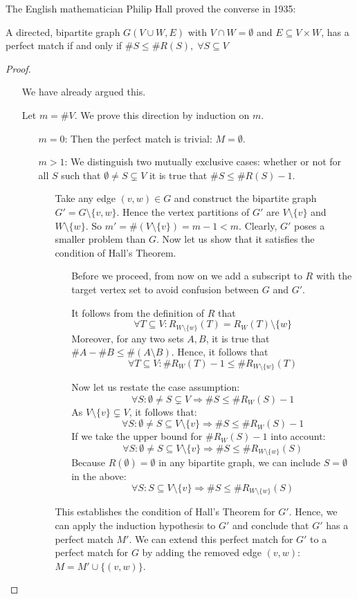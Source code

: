 The English mathematician Philip Hall proved the converse in 1935:
\begin{theorem} \label{hall}
A directed, bipartite graph $G(V \cup W,E)$ with $V \cap W =
\emptyset$ and $E \subseteq V \times W$, has a perfect match if and
only if $\#S \leq \#R(S),\; \forall S \subseteq V$
\end{theorem}
\begin{proof}~
\begin{itemize}
\item[\fbox{$\Rightarrow$}]
We have already argued this.
\item[\fbox{$\Leftarrow$}]
Let $m = \#V$. We prove this direction by induction on $m$.
\begin{itemize}
\item[\underline{$m=0$}:] Then the perfect match is trivial: $M = \emptyset$.
\item[\underline{$m>1$}:] 
We distinguish two mutually exclusive cases: whether or not 
for all $S$ such that $\emptyset \neq S \subsetneq V$ it
is true that $\#S \leq \#R(S) - 1$.
\begin{itemize}
\item[\dashuline{$\forall S: \emptyset \neq S \subsetneq V \Rightarrow \#S \leq
\#R(S) - 1$:}] Take any edge $(v,w) \in G$ and construct the bipartite graph
$G' = G \setminus \{v,w\}$. Hence the vertex partitions of $G'$ are $V
\setminus \{v\}$ and $W \setminus \{w\}$. So $m' = \#(V \setminus \{v\}) = m - 1 < m$.
Clearly, $G'$ poses a smaller problem than $G$. Now let us show that it satisfies
the condition of Hall's Theorem.
\begin{itemize}
\item[]
Before we proceed, from now on we add a subscript to $R$ with the target vertex
set to avoid confusion between $G$ and $G'$. 

It follows from the definition of $R$ that 
\[ \forall T \subseteq V: R_{W \setminus \{w\}}(T) = R_W(T) \setminus \{ w\}\] 
Moreover, for any two sets $A, B$, it is true that $\#A - \#B \leq \#(A
\setminus B)$. Hence, it follows that
\[ \forall T \subseteq V:  \#R_W(T) - 1 \leq \#R_{W \setminus \{w\}}(T)\] 

Now let us restate the case assumption:
\[\forall S: \emptyset \neq S \subsetneq V \Rightarrow \#S \leq \#R_W(S) - 1\]
As $V \setminus \{ v \} \subsetneq V$, it follows that:
\[\forall S: \emptyset \neq S \subseteq V\setminus \{ v \} \Rightarrow \#S \leq \#R_W(S) - 1\]
If we take the upper bound for $\#R_W(S) - 1$ into account:
\[\forall S: \emptyset \neq S \subseteq V\setminus \{ v \} \Rightarrow \#S \leq \#R_{W\setminus\{w\}}(S)\]
Because $R(\emptyset) = \emptyset$ in any bipartite graph, we can include $S = \emptyset$ in the above:
\[\forall S: S \subseteq V\setminus \{ v \} \Rightarrow \#S \leq \#R_{W\setminus\{w\}}(S)\]
\end{itemize}
This establishes the condition of Hall's Theorem for $G'$. Hence, we can apply the induction
hypothesis to $G'$ and conclude that $G'$ has a perfect match $M'$. We can extend
this perfect match for $G'$ to a perfect match for $G$ by adding the removed edge $(v,w)$:
$M = M' \cup \{ (v,w)\}$.
 

\end{itemize}
\end{itemize}
\end{itemize}
\end{proof}
